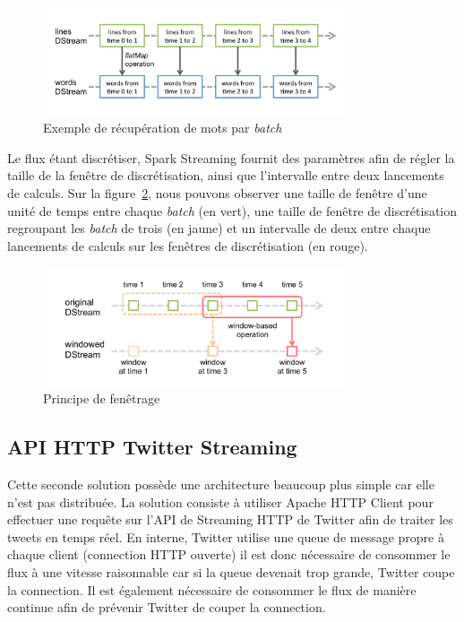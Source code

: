   \begin{figure}
    \centering
    \includegraphics[width=0.8\textwidth]{images/streaming-dstream-ops.png}
    \caption{Exemple de récupération de mots par \emph{batch}}
    \label{streaming_dstream_get_word}
  \end{figure}

  Le flux étant discrétiser, Spark Streaming fournit des paramètres afin de régler la taille de la fenêtre de discrétisation, ainsi que l'intervalle entre deux lancements de calculs. Sur la figure~\ref{principe_de_fenetre_spark_streaming}, nous pouvons observer une taille de fenêtre d'une unité de temps entre chaque \emph{batch} (en vert), une taille de fenêtre de discrétisation regroupant les \emph{batch} de trois (en jaune) et un intervalle de deux entre chaque lancements de calculs sur les fenêtres de discrétisation (en rouge).

  \begin{figure}
    \centering
    \includegraphics[width=0.8\textwidth]{images/streaming-dstream-window.png}
    \caption{Principe de fenêtrage}
    \label{principe_de_fenetre_spark_streaming}
  \end{figure}

  \subsection{API HTTP Twitter Streaming }
  \label{sub:API HTTP Twitter Streaming}
  Cette seconde solution possède une architecture beaucoup plus simple car elle n'est pas distribuée. La solution consiste à utiliser Apache HTTP Client pour effectuer une requête sur l'API de Streaming HTTP de Twitter afin de traiter les tweets en temps réel. En interne, Twitter utilise une queue de message propre à chaque client (connection HTTP ouverte) il est donc nécessaire de consommer le flux à une vitesse raisonnable car si la queue devenait trop grande, Twitter coupe la connection. Il est également nécessaire de consommer le flux de manière continue afin de prévenir Twitter de couper la connection.\\

